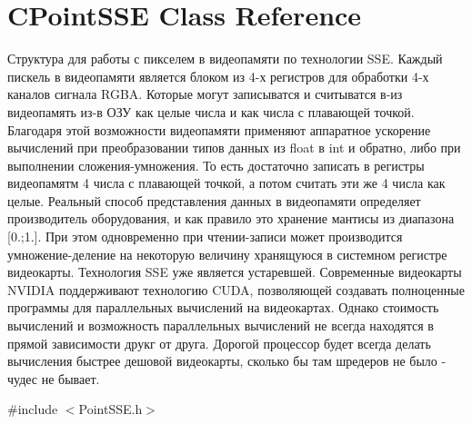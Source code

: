 \hypertarget{class_c_point_s_s_e}{\section{C\+Point\+S\+S\+E Class Reference}
\label{class_c_point_s_s_e}
}


Структура для работы с пикселем в видеопамяти по технологии S\+S\+E. Каждый пискель в видеопамяти является блоком из 4-\/х регистров для обработки 4-\/х каналов сигнала R\+G\+B\+A. Которые могут записыватся и считыватся в-\/из видеопамять из-\/в ОЗУ как целые числа и как числа с плавающей точкой. Благодаря этой возможности видеопамяти применяют аппаратное ускорение вычислений при преобразовании типов данных из float в int и обратно, либо при выполнении сложения-\/умножения. То есть достаточно записать в регистры видеопамятм 4 числа с плавающей точкой, а потом считать эти же 4 числа как целые. Реальный способ представления данных в видеопамяти определяет производитель оборудования, и как правило это хранение мантисы из диапазона \mbox{[}0.;1.\mbox{]}. При этом одновременно при чтении-\/записи может производится умножение-\/деление на некоторую величину хранящуюся в системном регистре видеокарты. Технология S\+S\+E уже является устаревшей. Современные видеокарты N\+V\+I\+D\+I\+A поддерживают технологию C\+U\+D\+A, позволяющей создавать полноценные программы для параллельных вычислений на видеокартах. Однако стоимость вычислений и возможность параллельных вычислений не всегда находятся в прямой зависимости друкг от друга. Дорогой процессор будет всегда делать вычисления быстрее дешовой видеокарты, сколько бы там шредеров не было -\/ чудес не бывает.  




{\ttfamily \#include $<$Point\+S\+S\+E.\+h$>$}

